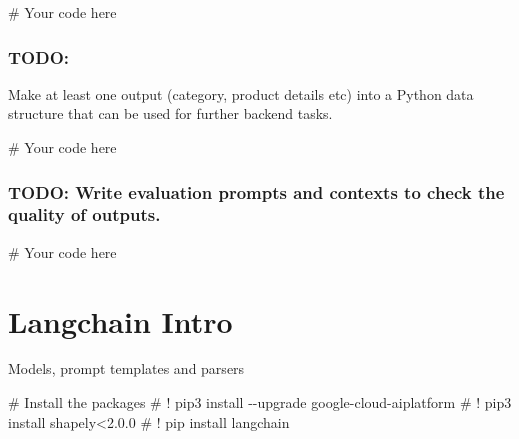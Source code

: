 \documentclass[
  letterpaper,
  DIV=11,
  numbers=noendperiod]{scrreprt}
\newenvironment{Shaded}{\begin{snugshade}}{\end{snugshade}}
\newcommand{\CommentTok}[1]{\textcolor[rgb]{0.37,0.37,0.37}{#1}}
\begin{document}
\begin{Shaded}
\begin{Highlighting}[]
\CommentTok{\# Your code here}
\end{Highlighting}
\end{Shaded}

\hypertarget{todo}{%
\subsection{TODO:}\label{todo}}

Make at least one output (category, product details etc) into a Python
data structure that can be used for further backend tasks.

\begin{Shaded}
\begin{Highlighting}[]
\CommentTok{\# Your code here}
\end{Highlighting}
\end{Shaded}

\hypertarget{todo-write-evaluation-prompts-and-contexts-to-check-the-quality-of-outputs.}{%
\subsection{TODO: Write evaluation prompts and contexts to check the
quality of
outputs.}\label{todo-write-evaluation-prompts-and-contexts-to-check-the-quality-of-outputs.}}

\begin{Shaded}
\begin{Highlighting}[]
\CommentTok{\# Your code here}
\end{Highlighting}
\end{Shaded}


\hypertarget{langchain-intro}{%
\chapter{Langchain Intro}\label{langchain-intro}}

Models, prompt templates and parsers

\begin{Shaded}
\begin{Highlighting}[]
\CommentTok{\# Install the packages}
\CommentTok{\# ! pip3 install {-}{-}upgrade google{-}cloud{-}aiplatform}
\CommentTok{\# ! pip3 install shapely\textless{}2.0.0}
\CommentTok{\# ! pip install langchain}
\end{Highlighting}
\end{Shaded}
\end{document}
